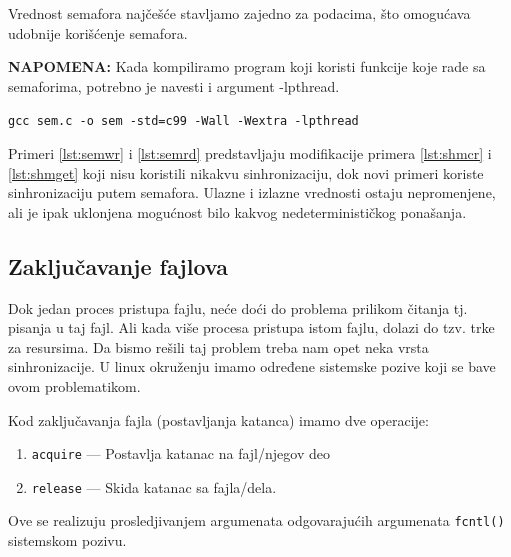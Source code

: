 \documentclass[a4paper, 11pt]{article}
\newcommand{\scode}[3] {
	\hspace{.06\textwidth} 
	\begin{minipage}[t]{.88\textwidth} %
		\begin{mdframed}[topline=true,bottomline=true,leftline=true,rightline=true,backgroundcolor=gray!22, linecolor=gray!60!black,roundcorner=1mm]
			 

	\begin{center}
		\caption{\textbf{Primer \ref{lst:#3}:} #2}
	\end{center}
	\end{mdframed}
	\end{minipage}

}
\begin{document}
Vrednost semafora najčešće stavljamo zajedno za podacima, što omogućava udobnije korišćenje semafora.

\scode{structsem.c}{Struktura koja sadrži semafore}{semstruct}


\vspace{2mm} 
 \textbf{NAPOMENA:} Kada kompiliramo program koji koristi funkcije koje rade sa semaforima, potrebno je navesti i argument -lpthread. 

\begin{center}
	\texttt{gcc sem.c -o sem -std=c99 -Wall -Wextra -lpthread} 
\end{center}



\newpage

Primeri \ref{lst:semwr} i \ref{lst:semrd} predstavljaju modifikacije  primera \ref{lst:shmcr} i \ref{lst:shmget} koji nisu koristili nikakvu sinhronizaciju, dok novi primeri koriste sinhronizaciju putem semafora. Ulazne i izlazne vrednosti ostaju nepromenjene, ali je ipak uklonjena mogućnost bilo kakvog nedeterminističkog ponašanja.

\scode{sem_shm_writer.c}{Modifikacija primera \ref{lst:shmcr}}{semwr}

\scode{sem_shm_reader.c}{Modifikacija primera \ref{lst:shmget}}{semrd}

\subsection{Zaključavanje fajlova}

Dok jedan proces pristupa fajlu, neće doći do problema prilikom čitanja tj. pisanja u taj fajl. Ali kada više procesa pristupa istom fajlu, dolazi do tzv. trke za resursima. Da bismo rešili taj problem treba nam opet neka vrsta sinhronizacije. U linux okruženju imamo određene sistemske pozive koji se bave ovom problematikom.

Kod zaključavanja fajla (postavljanja katanca) imamo dve operacije: 
\vspace{-2mm} 
\begin{enumerate}[1)]
	\item{\texttt{acquire} --- Postavlja katanac na fajl/njegov deo}
	\item{\texttt{release} --- Skida katanac sa fajla/dela}.
\end{enumerate}

Ove se realizuju prosledjivanjem argumenata odgovarajućih argumenata \texttt{fcntl()} sistemskom pozivu.
\end{document}
